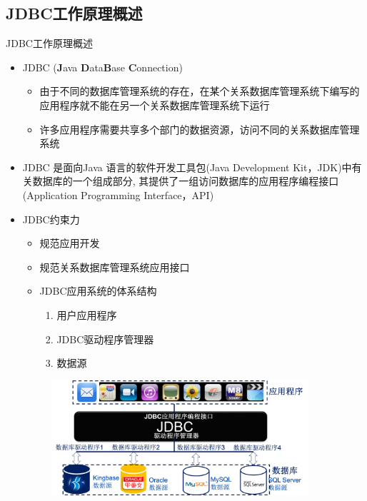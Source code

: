 \subsection{JDBC工作原理概述}
\begin{frame}{JDBC工作原理概述}
\begin{itemize}
    \item JDBC (\textbf{J}ava \textbf{D}ata\textbf{B}ase \textbf{C}onnection)
    \begin{itemize}
        \item 由于不同的数据库管理系统的存在，在某个关系数据库管理系统下编写的应用程序就不能在另一个关系数据库管理系统下运行  
        \item 许多应用程序需要共享多个部门的数据资源，访问不同的关系数据库管理系统
    \end{itemize}
    \item JDBC 是面向Java 语言的软件开发工具包(Java Development Kit，JDK)中有关数据库的一个组成部分, 其提供了一组访问数据库的应用程序编程接口(Application Programming Interface，API)
    \item JDBC约束力
    \begin{itemize}
        \item 规范应用开发
        \item 规范关系数据库管理系统应用接口
    \end{itemize}
    \framebreak
    \begin{itemize}
        \item JDBC应用系统的体系结构 
        \begin{enumerate}
            \item 用户应用程序 
            \item JDBC驱动程序管理器 
            \item 数据源
        \end{enumerate}
    \end{itemize}
    \framebreak
    \begin{figure}
        \centering
        \includegraphics[width=0.9\textwidth]{figure/fig-10.jpg}
    \end{figure}
\end{itemize}
\end{frame}


